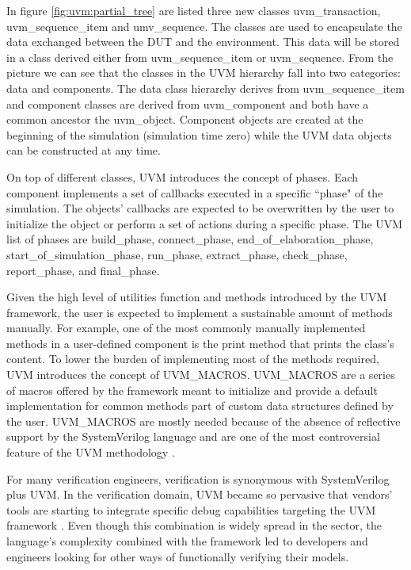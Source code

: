 \par In figure \ref{fig:uvm:partial_tree} are listed three new classes
uvm\_transaction, uvm\_sequence\_item and umv\_sequence. The classes are used to
encapsulate the data exchanged between the DUT and the environment. This data
will be stored in a class derived either from uvm\_sequence\_item or
uvm\_sequence. From the picture we can see that the classes in the UVM hierarchy
fall into two categories: data and components. The data class hierarchy derives
from uvm\_sequence\_item and component classes are derived from uvm\_component
and both have a common ancestor the uvm\_object. Component objects are created
at the beginning of the simulation (simulation time zero) while the UVM data
objects can be constructed at any time.

\par On top of different classes, UVM introduces the concept of phases. Each
component implements a set of callbacks executed in a specific ``phase" of the
simulation. The objects' callbacks are expected to be overwritten by the user to
initialize the object or perform a set of actions during a specific phase. The
UVM list of phases are build\_phase, connect\_phase,
end\_of\_elaboration\_phase, start\_of\_simulation\_phase, run\_phase,
extract\_phase, check\_phase, report\_phase, and final\_phase.


\par Given the high level of utilities function and methods introduced by the
UVM framework, the user is expected to implement a sustainable amount of methods
manually. For example, one of the most commonly manually implemented methods in
a user-defined component is the print method that prints the class's content. To
lower the burden of implementing most of the methods required, UVM introduces
the concept of UVM\_MACROS. UVM\_MACROS are a series of macros offered by the
framework meant to initialize and provide a default implementation for common
methods part of custom data structures defined by the user. UVM\_MACROS are
mostly needed because of the absence of reflective support by the SystemVerilog
language and are one of the most controversial feature of the UVM methodology
\cite{ bromley2013if, online:sysvreflections}.

\par For many verification engineers, verification is synonymous with
SystemVerilog plus UVM. In the verification domain, UVM became so pervasive that
vendors' tools are starting to integrate specific debug capabilities targeting
the UVM framework \cite{bromley2013if}. Even though this combination is widely
spread in the sector, the language's complexity combined with the framework led
to developers and engineers looking for other ways of functionally verifying
their models.

